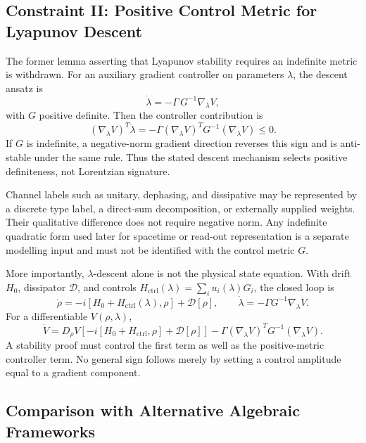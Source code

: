 \documentclass[12pt,a4paper,openany]{book}
\begin{document}
\subsection{Constraint II: Positive Control Metric for Lyapunov Descent}
\label{B-sec:metric}

The former lemma asserting that Lyapunov stability requires an indefinite metric is withdrawn.  For an auxiliary gradient controller on parameters $\lambda$, the descent ansatz is
\begin{equation}
\dot{\lambda} = -\Gamma\, G^{-1} \nabla_\lambda V,
\label{B-eq:gradient}
\end{equation}
with $G$ positive definite.  Then the controller contribution is
\begin{equation}
(\nabla_\lambda V)^T\dot\lambda
=-\Gamma(\nabla_\lambda V)^TG^{-1}(\nabla_\lambda V)\leq0.
\end{equation}
If $G$ is indefinite, a negative-norm gradient direction reverses this sign and is anti-stable under the same rule.  Thus the stated descent mechanism selects positive definiteness, not Lorentzian signature.

Channel labels such as unitary, dephasing, and dissipative may be represented by a discrete type label, a direct-sum decomposition, or externally supplied weights.  Their qualitative difference does not require negative norm.  Any indefinite quadratic form used later for spacetime or read-out representation is a separate modelling input and must not be identified with the control metric $G$.

More importantly, $\lambda$-descent alone is not the physical state equation.  With drift $H_0$, dissipator $\mathcal D$, and controls $H_{\mathrm{ctrl}}(\lambda)=\sum_i u_i(\lambda)G_i$, the closed loop is
\begin{equation}
\dot\rho= -i[H_0+H_{\mathrm{ctrl}}(\lambda),\rho]+\mathcal D[\rho],
\qquad
\dot\lambda=-\Gamma G^{-1}\nabla_\lambda V.
\end{equation}
For a differentiable $V(\rho,\lambda)$,
\begin{equation}
\dot V=D_\rho V\!\left[-i[H_0+H_{\mathrm{ctrl}},\rho]+\mathcal D[\rho]\right]
-\Gamma(\nabla_\lambda V)^TG^{-1}(\nabla_\lambda V).
\end{equation}
A stability proof must control the first term as well as the positive-metric controller term.  No general sign follows merely by setting a control amplitude equal to a gradient component.

\subsection{Comparison with Alternative Algebraic Frameworks}
\label{B-sec:exclusion}
\end{document}

